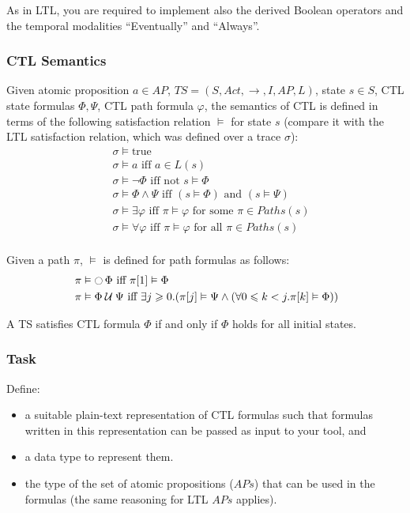 \documentclass{article}
\begin{document}
As in LTL, you are required to implement also the derived Boolean operators and the temporal modalities ``Eventually'' and ``Always''.

\subsubsection*{CTL Semantics}
Given atomic proposition $a \in AP$, $TS = (S, Act, \rightarrow, I, AP, L)$, state $s \in S$, CTL state formulas 
$\Phi, \Psi$, CTL path formula $\varphi$, the semantics of CTL is defined in terms of the following 
satisfaction relation $\vDash$ for state $s$ (compare it with the LTL satisfaction relation, which was defined over a trace $\sigma$):
\begin{align*}
    &\; \sigma \vDash \text{true} \\
    &\; \sigma \vDash a \text{ iff } a \in L(s) \\ 
    &\; \sigma \vDash \neg \Phi \text{ iff not } s \vDash \Phi \\
    &\; \sigma \vDash \Phi \land \Psi \text{ iff } (s \vDash \Phi) \text{ and } (s \vDash \Psi) \\
    &\; \sigma \vDash \exists \varphi \text{ iff } \pi \vDash \varphi \text{ for some } \pi \in Paths(s) \\ 
    &\; \sigma \vDash \forall \varphi \text{ iff } \pi \vDash \varphi \text{ for all } \pi \in Paths(s) \\ 
\end{align*}

Given a path $\pi$, $\vDash$ is defined for path formulas as follows: 
\begin{align*}
    &\; \pi \vDash \mathop{\ocircle}{\Phi} \text{ iff } \pi[1]  \vDash \Phi \\ 
    &\; \pi \vDash \Phi \mathbin{\mathcal{U}} \Psi \text{ iff } \exists j \geqslant 0. (\pi[j]  \vDash \Psi \land (\forall 0 \leqslant k < j. \pi[k]  \vDash \Phi))
\end{align*}

A TS satisfies CTL formula $\Phi$ if and only if $\Phi$ holds for all initial states.

\subsubsection*{Task}
Define:
\begin{itemize}
    \item a suitable plain-text representation of CTL formulas such that formulas written in this representation can be passed as input to your tool, and 
    \item a data type to represent them.
    \item the type of the set of atomic propositions ($APs$) that can be used in the formulas (the same reasoning for LTL $APs$ applies).
\end{itemize}
\end{document}
